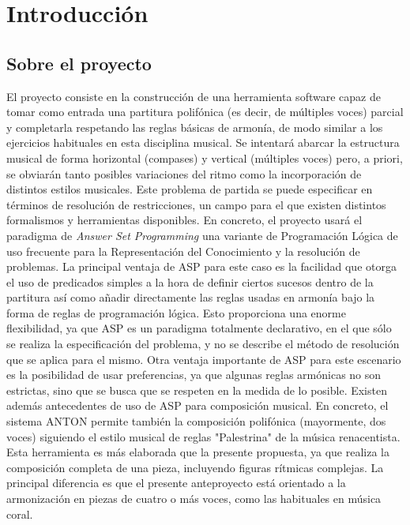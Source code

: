 \chapter{Introducción}
\minitoc
\label{chap:introduccion}

\section{Sobre el proyecto}

El proyecto consiste en la construcción de una herramienta software capaz de tomar como entrada una partitura polifónica (es decir, de múltiples voces) parcial y completarla respetando las reglas básicas de armonía, de modo similar a los ejercicios habituales en esta disciplina musical. Se intentará abarcar la estructura musical de forma horizontal (compases) y vertical (múltiples voces) pero, a priori, se obviarán tanto posibles variaciones del ritmo como la incorporación de distintos estilos musicales. Este problema de partida se puede especificar en términos de resolución de restricciones, un campo para el que existen distintos formalismos y herramientas disponibles. En concreto, el proyecto usará el paradigma de \textit{Answer Set Programming} una variante de Programación Lógica de uso frecuente para la Representación del Conocimiento y la resolución de problemas. La principal ventaja de ASP para este caso es la facilidad que otorga el uso de predicados simples a la hora de definir ciertos sucesos dentro de la partitura así como añadir directamente las reglas usadas en armonía bajo la forma de reglas de programación lógica. Esto proporciona una enorme flexibilidad, ya que ASP es un paradigma totalmente declarativo, en el que sólo se realiza la especificación del problema, y no se describe el método de resolución que se aplica para el mismo. Otra ventaja importante de ASP para este escenario es la posibilidad de usar preferencias, ya que algunas reglas armónicas no son estrictas, sino que se busca que se respeten en la medida de lo posible. Existen además antecedentes de uso de ASP para composición musical. En concreto, el sistema ANTON permite también la composición polifónica (mayormente, dos voces) siguiendo el estilo musical de reglas "Palestrina" de la música renacentista. Esta herramienta es más elaborada que la presente propuesta, ya que realiza la composición completa de una pieza, incluyendo figuras rítmicas complejas. La principal diferencia es que el presente anteproyecto está orientado a la armonización en piezas de cuatro o más voces, como las habituales en música coral.

